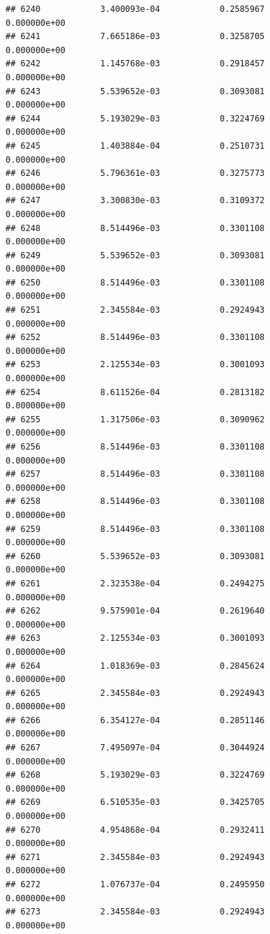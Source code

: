 \documentclass[
]{article}
\begin{document}
\begin{verbatim}
## 6240            3.400093e-04            0.2585967            0.000000e+00
## 6241            7.665186e-03            0.3258705            0.000000e+00
## 6242            1.145768e-03            0.2918457            0.000000e+00
## 6243            5.539652e-03            0.3093081            0.000000e+00
## 6244            5.193029e-03            0.3224769            0.000000e+00
## 6245            1.403884e-04            0.2510731            0.000000e+00
## 6246            5.796361e-03            0.3275773            0.000000e+00
## 6247            3.300830e-03            0.3109372            0.000000e+00
## 6248            8.514496e-03            0.3301108            0.000000e+00
## 6249            5.539652e-03            0.3093081            0.000000e+00
## 6250            8.514496e-03            0.3301108            0.000000e+00
## 6251            2.345584e-03            0.2924943            0.000000e+00
## 6252            8.514496e-03            0.3301108            0.000000e+00
## 6253            2.125534e-03            0.3001093            0.000000e+00
## 6254            8.611526e-04            0.2813182            0.000000e+00
## 6255            1.317506e-03            0.3090962            0.000000e+00
## 6256            8.514496e-03            0.3301108            0.000000e+00
## 6257            8.514496e-03            0.3301108            0.000000e+00
## 6258            8.514496e-03            0.3301108            0.000000e+00
## 6259            8.514496e-03            0.3301108            0.000000e+00
## 6260            5.539652e-03            0.3093081            0.000000e+00
## 6261            2.323538e-04            0.2494275            0.000000e+00
## 6262            9.575901e-04            0.2619640            0.000000e+00
## 6263            2.125534e-03            0.3001093            0.000000e+00
## 6264            1.018369e-03            0.2845624            0.000000e+00
## 6265            2.345584e-03            0.2924943            0.000000e+00
## 6266            6.354127e-04            0.2851146            0.000000e+00
## 6267            7.495097e-04            0.3044924            0.000000e+00
## 6268            5.193029e-03            0.3224769            0.000000e+00
## 6269            6.510535e-03            0.3425705            0.000000e+00
## 6270            4.954868e-04            0.2932411            0.000000e+00
## 6271            2.345584e-03            0.2924943            0.000000e+00
## 6272            1.076737e-04            0.2495950            0.000000e+00
## 6273            2.345584e-03            0.2924943            0.000000e+00

\end{verbatim}
\end{document}

